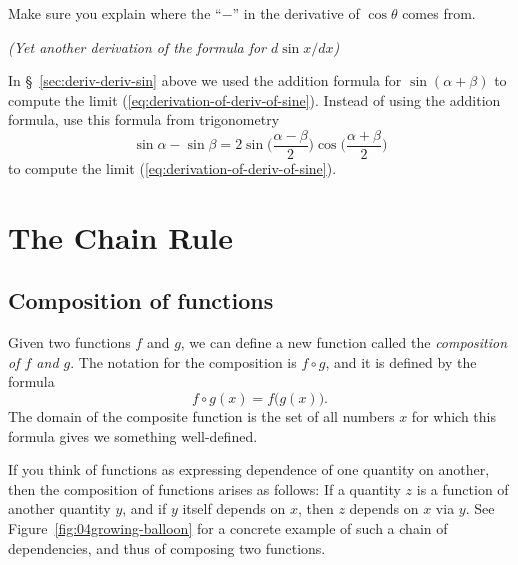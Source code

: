 \begin{multicols}{2}
Make sure you explain where the ``$-$'' in the derivative of $\cos\theta$ comes from.




\problem \groupproblem \textit{(Yet another derivation of the formula for 
$d\sin x / dx$)}




In \S~\ref{sec:deriv-deriv-sin} above we used the addition formula for
$\sin(\alpha+\beta)$ to compute the limit
(\ref{eq:derivation-of-deriv-of-sine}).  Instead of using the addition
formula, use this formula from trigonometry
\[
\sin\alpha - \sin\beta
=
2\sin \bigl(\frac{\alpha-\beta} {2}\bigr) \cos\bigl(\frac{\alpha+\beta} {2}\bigr)
\]
to compute the limit (\ref{eq:derivation-of-deriv-of-sine}).




\end{multicols}












\noproblemfont
\section{The Chain Rule} 
\subsection{Composition of functions} 
Given two functions $f$ and $g$, we can define a new function called
the \emph{composition of $f$ and $g$}.  The notation for the
composition is $f\circ g$, and it is defined by the formula
\[
f\circ g(x)  = f\bigl(g(x)\bigr).
\]
The domain of the composite function is the set of all numbers $x$ for which
this formula gives we something well-defined.




If you think of functions as expressing dependence of one quantity on another,
then the composition of functions arises as follows:  If a quantity $z$ is a
function of another quantity $y$, and if $y$ itself depends on $x$, then $z$
depends on $x$ via $y$.  See Figure~\ref{fig:04growing-balloon} for a concrete
example of such a chain of dependencies, and thus of composing two functions.












